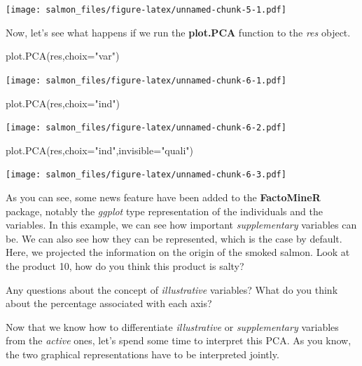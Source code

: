 \documentclass[
]{book}
\newenvironment{Shaded}{\begin{snugshade}}{\end{snugshade}}
\newcommand{\AttributeTok}[1]{\textcolor[rgb]{0.77,0.63,0.00}{#1}}
\newcommand{\FunctionTok}[1]{\textcolor[rgb]{0.00,0.00,0.00}{#1}}
\newcommand{\NormalTok}[1]{#1}
\newcommand{\StringTok}[1]{\textcolor[rgb]{0.31,0.60,0.02}{#1}}
\begin{document}
\texttt{[image: salmon\_files/figure-latex/unnamed-chunk-5-1.pdf]}

Now, let's see what happens if we run the \textbf{plot.PCA} function to the \emph{res} object.

\begin{Shaded}
\begin{Highlighting}[]
\FunctionTok{plot.PCA}\NormalTok{(res,}\AttributeTok{choix=}\StringTok{"var"}\NormalTok{)}
\end{Highlighting}
\end{Shaded}

\texttt{[image: salmon\_files/figure-latex/unnamed-chunk-6-1.pdf]}

\begin{Shaded}
\begin{Highlighting}[]
\FunctionTok{plot.PCA}\NormalTok{(res,}\AttributeTok{choix=}\StringTok{"ind"}\NormalTok{)}
\end{Highlighting}
\end{Shaded}

\texttt{[image: salmon\_files/figure-latex/unnamed-chunk-6-2.pdf]}

\begin{Shaded}
\begin{Highlighting}[]
\FunctionTok{plot.PCA}\NormalTok{(res,}\AttributeTok{choix=}\StringTok{"ind"}\NormalTok{,}\AttributeTok{invisible=}\StringTok{"quali"}\NormalTok{)}
\end{Highlighting}
\end{Shaded}

\texttt{[image: salmon\_files/figure-latex/unnamed-chunk-6-3.pdf]}

As you can see, some news feature have been added to the \textbf{FactoMineR} package, notably the \emph{ggplot} type representation of the individuals and the variables. In this example, we can see how important \emph{supplementary} variables can be. We can also see how they can be represented, which is the case by default. Here, we projected the information on the origin of the smoked salmon. Look at the product 10, how do you think this product is salty?

Any questions about the concept of \emph{illustrative} variables? What do you think about the percentage associated with each axis?

Now that we know how to differentiate \emph{illustrative} or \emph{supplementary} variables from the \emph{active} ones, let's spend some time to interpret this PCA. As you know, the two graphical representations have to be interpreted jointly.
\end{document}
